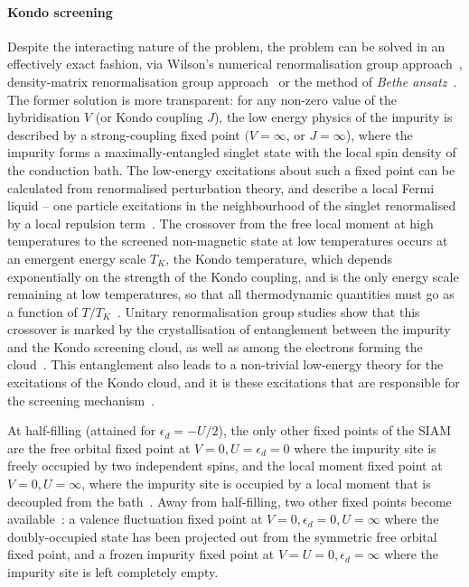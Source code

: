 \paragraph{Kondo screening}
Despite the interacting nature of the problem, the problem can be solved in an effectively exact fashion, via Wilson's numerical renormalisation group approach~\cite{wilson1975renormalization,hrk_wilson_1980}, density-matrix renormalisation group approach~\cite{Nishimoto_2004} or the method of {\it Bethe ansatz}~\cite{andrei_1980,Wiegmann_1981}. The former solution is more transparent: for any non-zero value of the hybridisation \(V\) (or Kondo coupling \(J\)), the low energy physics of the impurity is described by a strong-coupling fixed point \((V=\infty\), or \(J=\infty\)), where the impurity forms a maximally-entangled singlet state with the local spin density of the conduction bath. The low-energy excitations about such a fixed point can be calculated from renormalised perturbation theory, and describe a local Fermi liquid -- one particle excitations in the neighbourhood of the singlet renormalised by a local repulsion term~\cite{nozieres1974fermi,affleck1995conformal}. The crossover from the free local moment at high temperatures to the screened non-magnetic state at low temperatures occurs at an emergent energy scale \(T_K\), the Kondo temperature, which depends exponentially on the strength of the Kondo coupling, and is the only energy scale remaining at low temperatures, so that all thermodynamic quantities must go as a function of \(T/T_K\)~\cite{wilson1975renormalization}. Unitary renormalisation group studies show that this crossover is marked by the crystallisation of entanglement between the impurity and the Kondo screening cloud, as well as among the electrons forming the cloud~\cite{anirban_kondo}. This entanglement also leads to a non-trivial low-energy theory for the excitations of the Kondo cloud, and it is these excitations that are responsible for the screening mechanism~\cite{anirban_kondo}.

At half-filling (attained for \(\epsilon_d = -U/2\)), the only other fixed points of the SIAM are the free orbital fixed point at \(V=0, U=\epsilon_d=0\) where the impurity site is freely occupied by two independent spins, and the local moment fixed point at \(V=0, U=\infty\), where the impurity site is occupied by a local moment that is decoupled from the bath~\cite{hrk_wilson_1980,hewson1993}. Away from half-filling, two other fixed points become available~\cite{hrk_wilson_1980,hewson1993}: a valence fluctuation fixed point at \(V=0,\epsilon_d=0, U=\infty\) where the doubly-occupied state has been projected out from the symmetric free orbital fixed point, and a frozen impurity fixed point at \(V=U=0, \epsilon_d=\infty\) where the impurity site is left completely empty.


